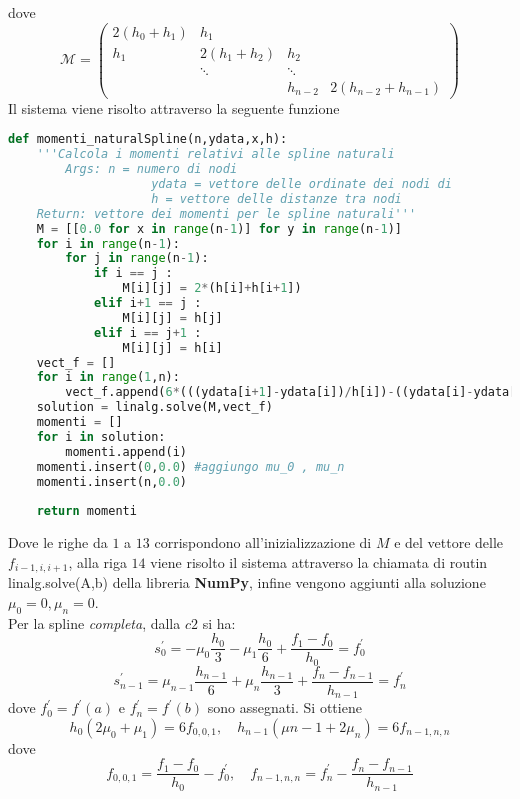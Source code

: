 \documentclass[a4paper,12pt]{report}
\theoremstyle{definition}
\begin{document}
dove 
\[\mathcal{M} = \left( \begin{array}{cccc}
2(h_0+h_1) & h_1 & & \\
h_1 & 2(h_1+h_2) & h_2 & \\
& \ddots & \ddots &  \\
 & & h_{n-2} & 2(h_{n-2}+h_{n-1}) \end{array} \right) \]
Il sistema viene risolto attraverso la seguente funzione\\
\begin{lstlisting}[language=Python]
def momenti_naturalSpline(n,ydata,x,h):
	'''Calcola i momenti relativi alle spline naturali
		Args: n = numero di nodi
					ydata = vettore delle ordinate dei nodi di 										interpolazione
					h = vettore delle distanze tra nodi
	Return: vettore dei momenti per le spline naturali'''
	M = [[0.0 for x in range(n-1)] for y in range(n-1)] 
	for i in range(n-1): 
		for j in range(n-1): 
			if i == j :
				M[i][j] = 2*(h[i]+h[i+1])
			elif i+1 == j :
				M[i][j] = h[j]
			elif i == j+1 :
				M[i][j] = h[i]
	vect_f = []
	for i in range(1,n):
		vect_f.append(6*(((ydata[i+1]-ydata[i])/h[i])-((ydata[i]-ydata[i-1])/h[i-1])))
	solution = linalg.solve(M,vect_f)
	momenti = []
	for i in solution:
		momenti.append(i)
	momenti.insert(0,0.0) #aggiungo mu_0 , mu_n
	momenti.insert(n,0.0)
	
	return momenti
\end{lstlisting}
Dove le righe da $1$ a $13$ corrispondono all'inizializzazione di $M$ e del vettore delle $f_{i-1,i,i+1}$, alla riga $14$ viene risolto il sistema attraverso la chiamata di routin linalg.solve(A,b) della libreria \textbf{NumPy}, infine vengono aggiunti alla soluzione $\mu_0 = 0 , \mu_n = 0 $.\\
Per la spline \textit{completa}, dalla $c2$ si ha:
$$s_0^\prime = -\mu_0 \frac{h_0}{3} -\mu_1 \frac{h_0}{6} + \frac{f_1 - f_0}{h_0} = f_0^\prime$$
$$s_{n-1}^\prime = \mu_{n-1} \frac{h_{n-1}}{6} + \mu_n \frac{h_{n-1}}{3} + \frac{f_n - f_{n-1}}{h_{n-1}} = f_n^\prime$$
dove $f_0^\prime = f^\prime(a)$ e $f_n^\prime = f^\prime(b)$ sono assegnati. Si ottiene $$h_0(2\mu_0 + \mu_1) = 6f_{0,0,1}, \quad h_{n-1}(\mu{n-1} + 2\mu_n) = 6 f_{n-1,n,n}$$dove
$$f_{0,0,1} = \frac{f_1 - f_0}{h_0} - f_0^\prime, \quad f_{n-1,n,n} = f_n^\prime - \frac{f_n - f_{n-1}}{h_{n-1}} $$
\end{document}
